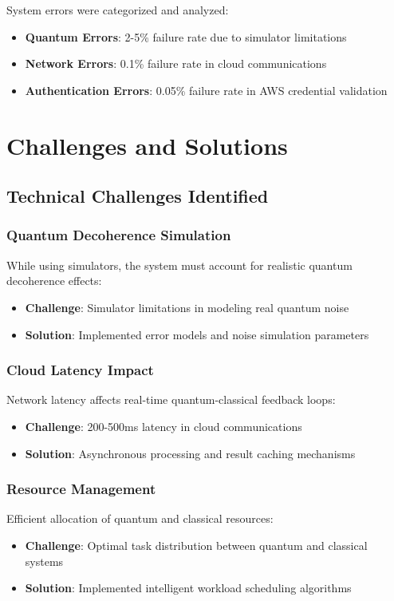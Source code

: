\documentclass[conference]{IEEEtran}
\begin{document}
System errors were categorized and analyzed:
\begin{itemize}
    \item \textbf{Quantum Errors}: 2-5\% failure rate due to simulator limitations
    \item \textbf{Network Errors}: 0.1\% failure rate in cloud communications
    \item \textbf{Authentication Errors}: 0.05\% failure rate in AWS credential validation
\end{itemize}

\section{Challenges and Solutions}

\subsection{Technical Challenges Identified}

\subsubsection{Quantum Decoherence Simulation}
While using simulators, the system must account for realistic quantum decoherence effects:
\begin{itemize}
    \item \textbf{Challenge}: Simulator limitations in modeling real quantum noise
    \item \textbf{Solution}: Implemented error models and noise simulation parameters
\end{itemize}

\subsubsection{Cloud Latency Impact}
Network latency affects real-time quantum-classical feedback loops:
\begin{itemize}
    \item \textbf{Challenge}: 200-500ms latency in cloud communications
    \item \textbf{Solution}: Asynchronous processing and result caching mechanisms
\end{itemize}

\subsubsection{Resource Management}
Efficient allocation of quantum and classical resources:
\begin{itemize}
    \item \textbf{Challenge}: Optimal task distribution between quantum and classical systems
    \item \textbf{Solution}: Implemented intelligent workload scheduling algorithms
\end{itemize}
\end{document}
